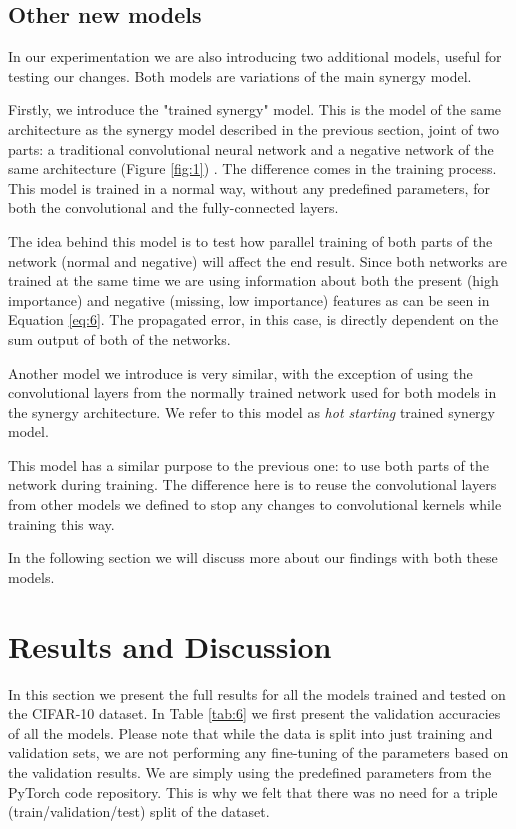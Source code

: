 \documentclass[b5paper]{book}
\begin{document}
\subsection{Other new models}
\label{other new models}

In our experimentation we are also introducing two additional models, useful for testing our changes. Both models are variations of the main synergy model.

Firstly, we introduce the "trained synergy" model. This is the model of the same architecture as the synergy model described in the previous section, joint of two parts: a traditional convolutional neural network and a negative network of the same architecture (Figure \ref{fig:1}) . The difference comes in the training process. This model is trained in a normal way, without any predefined parameters, for both the convolutional and the fully-connected layers. 

The idea behind this model is to test how parallel training of both parts of the network (normal and negative) will affect the end result. Since both networks are trained at the same time we are using information about both the present (high importance) and negative (missing, low importance) features as can be seen in Equation \ref{eq:6}. The propagated error, in this case, is directly dependent on the sum output of both of the networks. 

Another model we introduce is very similar, with the exception of using the convolutional layers from the normally trained network used for both models in the synergy architecture. We refer to this model as \emph{hot starting} trained synergy model. 

This model has a similar purpose to the previous one: to use both parts of the network during training. The difference here is to reuse the convolutional layers from other models we defined to stop any changes to convolutional kernels while training this way.

In the following section we will discuss more about our findings with both these models.

\section{Results and Discussion}
\label{results}

In this section we present the full results for all the models trained and tested on the CIFAR-10 dataset. In Table \ref{tab:6} we first present the validation accuracies of all the models. Please note that while the data is split into just training and validation sets, we are not performing any fine-tuning of the parameters based on the validation results. We are simply using the predefined parameters from the PyTorch code repository. This is why we felt that there was no need for a triple (train/validation/test) split of the dataset.
\end{document}
